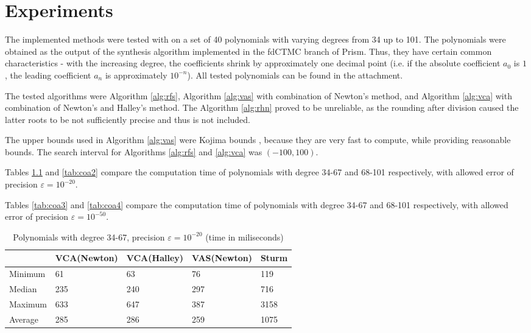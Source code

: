 \documentclass[
  digital, %
  notable,   %
  nolof,     %
  nolot,     %
	final, %
]{fithesis3}
\begin{document}
\chapter{Experiments}
The implemented methods were tested with on a set of 40 polynomials with varying degrees from 34 up to 101. The polynomials were obtained as the output of the synthesis algorithm implemented in the fdCTMC branch of Prism. Thus, they have certain common characteristics - with the increasing degree, the coefficients shrink by approximately one decimal point (i.e. if the absolute coefficient $a_{0}$ is $1$, the leading coefficient $a_{n}$ is approximately $10^{-n}$). All tested polynomials can be found in the attachment.

The tested algorithms were Algorithm \ref{alg:rfs}, Algorithm \ref{alg:vas} with combination of Newton's method, and Algorithm \ref{alg:vca} with combination of Newton's and Halley's method. The Algorithm \ref{alg:rhn} proved to be unreliable, as the rounding after division caused the latter roots to be not sufficiently precise and thus is not included.

The upper bounds used in Algorithm \ref{alg:vas} were Kojima bounds \parencite{kojima}, because they are very fast to compute, while providing reasonable bounds. The search interval for Algorithms \ref{alg:rfs} and \ref{alg:vca} was $(-100, 100)$.

Tables \ref{tab:coa1} and \ref{tab:coa2} compare the computation time of polynomials with degree 34-67 and 68-101 respectively, with allowed error of precision $\varepsilon = 10^{-20}$. 

Tables \ref{tab:coa3} and \ref{tab:coa4} compare the computation time of polynomials with degree 34-67 and 68-101 respectively, with allowed error of precision $\varepsilon = 10^{-50}$. 

\begin{table}
  \begin{tabular*}{\textwidth}{lllll}
    \toprule
     & VCA(Newton) & VCA(Halley) & VAS(Newton) & Sturm \\
    \midrule
			Minimum & 61 & 63 & 76 & 119 \\
			Median & 235 & 240 & 297 & 716 \\
			Maximum & 633 & 647 & 387 & 3158 \\
			Average & 285 & 286 & 259 & 1075 \\
    \bottomrule
  \end{tabular*}
  \caption{Polynomials with degree 34-67, precision $\varepsilon = 10^{-20}$ (time in miliseconds)}
  \label{tab:coa1}
\end{table}
\end{document}
